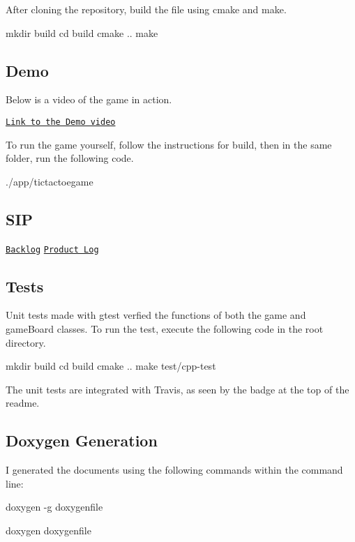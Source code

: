 After cloning the repository, build the file using cmake and make. \begin{DoxyVerb}mkdir build
cd build
cmake ..
make
\end{DoxyVerb}


\subsection*{Demo}

Below is a video of the game in action.

\href{https://drive.google.com/open?id=0BxfrmvtnmsrXdmNpLXRlMXR1T3M}{\tt Link to the Demo video}

To run the game yourself, follow the instructions for build, then in the same folder, run the following code. \begin{DoxyVerb}./app/tictactoegame
\end{DoxyVerb}


\subsection*{S\-I\-P}

\href{https://drive.google.com/open?id=1KFQ9Ns8AJOG_RbMY5DaGz2tUdGVuaAmlSZTdXr1TY-M}{\tt Backlog} \href{https://docs.google.com/spreadsheets/d/1cvphMVsGHO1l1VFnBONkp5L9tVWFDhlSldkhnq5PvsM/edit?usp=sharing}{\tt Product Log}

\subsection*{Tests}

Unit tests made with gtest verfied the functions of both the game and game\-Board classes. To run the test, execute the following code in the root directory. \begin{DoxyVerb}mkdir build
cd build
cmake ..
make
test/cpp-test
\end{DoxyVerb}


The unit tests are integrated with Travis, as seen by the badge at the top of the readme.

\subsection*{Doxygen Generation}

I generated the documents using the following commands within the command line\-:

doxygen -\/g doxygenfile

doxygen doxygenfile 